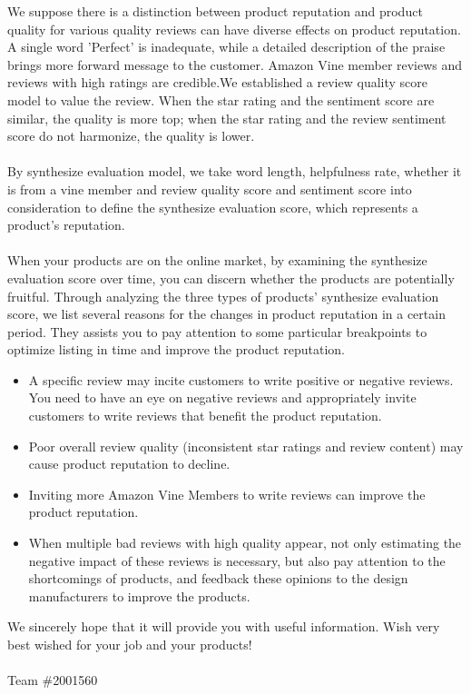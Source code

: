 \documentclass{mcmthesis}
\begin{document}
\begin{memo}[Letter]
We suppose there is a distinction between product reputation and product quality for various quality reviews can have diverse effects on product reputation. A single word 'Perfect' is inadequate, while a detailed description of the praise brings more forward message to the customer. Amazon Vine member reviews and reviews with high ratings are credible.We established a review quality score model to value the review. When the star rating and the sentiment score are similar, the quality is more top; when the star rating and the review sentiment score do not harmonize, the quality is lower.
\\\\
By synthesize evaluation model, we take word length, helpfulness rate, whether it is from a vine member and review quality score and sentiment score into consideration to define the synthesize evaluation score, which represents a product's reputation.
\\\\
When your products are on the online market, by examining the synthesize evaluation score over time, you can discern whether the products are potentially fruitful. Through analyzing the three types of products' synthesize evaluation score, we list several reasons for the changes in product reputation in a certain period. They assists you to pay attention to some particular breakpoints to optimize listing in time and improve the product reputation.
\begin{itemize}
	\item A specific review may incite customers to write positive or negative reviews. You need to have an eye on negative reviews and appropriately invite customers to write reviews that benefit the product reputation.

	\item Poor overall review quality (inconsistent star ratings and review content) may cause product reputation to decline.

	\item Inviting more Amazon Vine Members to write reviews can improve the product reputation.

	\item When multiple bad reviews with high quality appear, not only estimating the negative impact of these reviews is necessary, but also pay attention to the shortcomings of products, and feedback these opinions to the design manufacturers to improve the products.
\end{itemize}
We sincerely hope that it will provide you with useful information. Wish very best wished for your job and your products!
\\\\
Team \#2001560

\end{memo}
\end{document}
